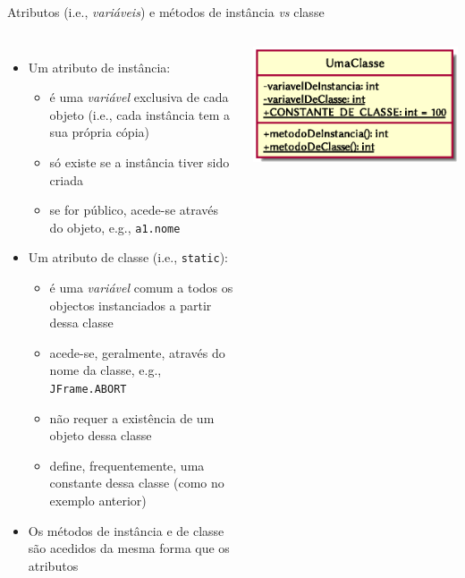 \documentclass[portuguese, aspectratio=169, xcolor=table]{beamer}
\begin{document}
\begin{frame}{Atributos (i.e., \textit{variáveis}) e métodos de instância \textit{vs} classe}
\begin{columns}
\begin{itemize}
    \item Um atributo de instância:
    \begin{itemize}
        \item é uma \textit{variável} exclusiva de cada objeto (i.e., cada instância tem a sua própria cópia)
        \item só existe se a instância tiver sido criada
        \item se for público, acede-se através do objeto, e.g., \texttt{a1.nome}
    \end{itemize}
    \item Um atributo de classe (i.e., \texttt{static}):
    \begin{itemize}
        \item é uma \textit{variável} comum a todos os objectos instanciados a partir dessa classe
        \item acede-se, geralmente, através do nome da classe, e.g., \texttt{JFrame.ABORT}
        \item não requer a existência de um objeto dessa classe
        \item define, frequentemente, uma constante dessa classe (como no exemplo anterior)
    \end{itemize}
    \item Os métodos de instância e de classe são acedidos da mesma forma que os atributos
\end{itemize}
\begin{center}
    \includegraphics[width=\linewidth]{./uml_diagrams/class6}
\end{center}
\end{columns}
\end{frame}
\end{document}
